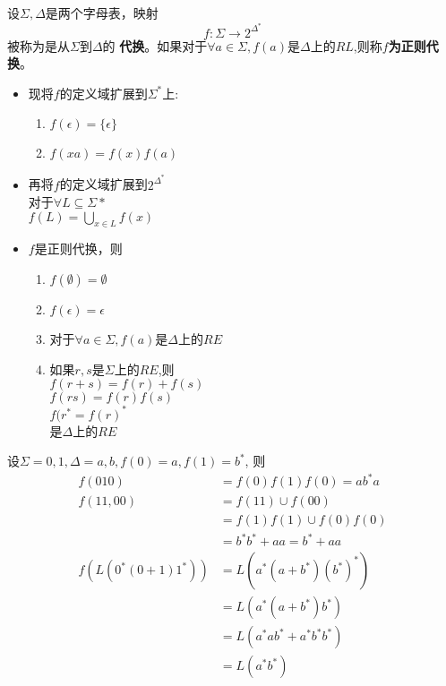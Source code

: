 设$\Sigma,\Delta$是两个字母表，映射
$$f:\Sigma \to 2^{\Delta^{\ast}}$$
被称为是从$\Sigma$到$\Delta$的
\textbf{代换}。如果对于$\forall a\in \Sigma,f(a)$是$\Delta$上的$RL$,则称\textbf{$f$为正则代换}。

\begin{itemize}
	\item 现将$f$的定义域扩展到$\Sigma^{\ast}$上:
	\begin{enumerate}
		\item $f(\epsilon) =\{\epsilon\}$
		\item $f(xa)=f(x)f(a)$
	\end{enumerate}
    \item 再将$f$的定义域扩展到$2^{\Delta^{\ast}}$\\
    对于$\forall L\subseteq \Sigma{\ast}$\\
    $f(L) = \bigcup\limits_{x\in L} f(x)$
    \item $f$是正则代换，则
    \begin{enumerate}
    	\item $f(\emptyset)=\emptyset$
    	\item $f(\epsilon)=\epsilon$
    	\item 对于$\forall a\in \Sigma,f(a)$是$\Delta$上的$RE$
    	\item 如果$r,s$是$\Sigma$上的$RE$,则\\
    	$f(r+s)=f(r)+f(s)$\\
    	$f(rs)=f(r)f(s)$\\
    	$f(r^{\ast}={f(r)}^{\ast}$\\
    	是$\Delta$上的$RE$
    \end{enumerate}
\end{itemize}

\begin{example}
	设$\Sigma={0,1},\Delta={a,b},f(0)=a,f(1)=b^{\ast}$, 则
	\begin{align*}
		f(010) &= f(0)f(1)f(0)=ab^{\ast}a\\
		f({11,00})&=f(11)\cup f(00) \\
		          &=f(1)f(1)\cup f(0)f(0)\\
		          &=b^{\ast}b^{\ast}+aa = b^{\ast}+aa \\
		f(L(0^{\ast}(0+1)1^{\ast})) &= L(a^{\ast}(a+b^{\ast}){(b^{\ast})}^{\ast})\\
		&= L(a^{\ast}(a+b^{\ast})b^{\ast})\\
		&= L(a^{\ast}ab^{\ast} + a^{\ast}b^{\ast}b^{\ast})\\
		&= L(a^{\ast}b^{\ast})
	\end{align*}
\end{example}

